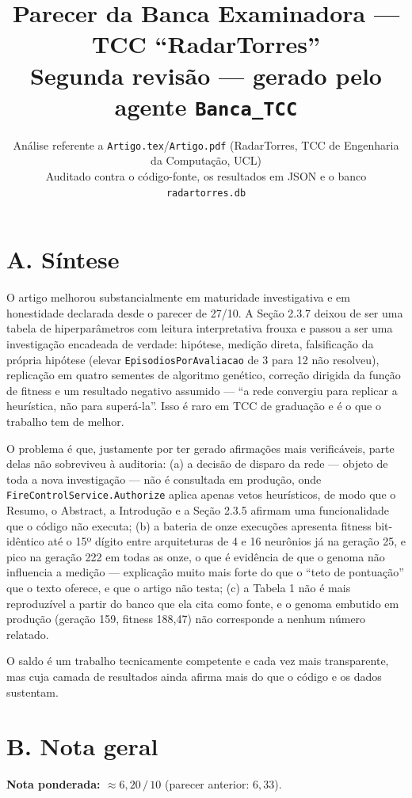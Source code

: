 \documentclass[11pt,a4paper]{article}
\title{\textbf{Parecer da Banca Examinadora — TCC ``RadarTorres''}\\[0.3em]
\large Segunda revisão — gerado pelo agente \texttt{Banca\_TCC}}
\author{}
\date{Análise referente a \texttt{Artigo.tex}/\texttt{Artigo.pdf} (RadarTorres, TCC de Engenharia da Computação, UCL)\\[0.3em]
Auditado contra o código-fonte, os resultados em JSON e o banco \texttt{radartorres.db}}
\begin{document}
\maketitle

\section*{A. Síntese}

O artigo melhorou substancialmente em maturidade investigativa e em honestidade declarada desde o
parecer de 27/10. A Seção 2.3.7 deixou de ser uma tabela de hiperparâmetros com leitura
interpretativa frouxa e passou a ser uma investigação encadeada de verdade: hipótese, medição
direta, falsificação da própria hipótese (elevar \texttt{EpisodiosPorAvaliacao} de 3 para 12 não
resolveu), replicação em quatro sementes de algoritmo genético, correção dirigida da função de
fitness e um resultado negativo assumido --- ``a rede convergiu para replicar a heurística, não
para superá-la''. Isso é raro em TCC de graduação e é o que o trabalho tem de melhor.

O problema é que, justamente por ter gerado afirmações mais verificáveis, parte delas não
sobreviveu à auditoria: (a) a decisão de disparo da rede --- objeto de toda a nova investigação ---
não é consultada em produção, onde \texttt{FireControlService.Authorize} aplica apenas vetos
heurísticos, de modo que o Resumo, o Abstract, a Introdução e a Seção 2.3.5 afirmam uma
funcionalidade que o código não executa; (b) a bateria de onze execuções apresenta fitness
bit-idêntico até o 15º dígito entre arquiteturas de 4 e 16 neurônios já na geração 25, e pico na
geração 222 em todas as onze, o que é evidência de que o genoma não influencia a medição ---
explicação muito mais forte do que o ``teto de pontuação'' que o texto oferece, e que o artigo não
testa; (c) a Tabela 1 não é mais reproduzível a partir do banco que ela cita como fonte, e o genoma
embutido em produção (geração 159, fitness 188,47) não corresponde a nenhum número relatado.

O saldo é um trabalho tecnicamente competente e cada vez mais transparente, mas cuja camada de
resultados ainda afirma mais do que o código e os dados sustentam.

\section*{B. Nota geral}

\textbf{Nota ponderada: $\approx 6{,}20\,/\,10$} \quad (parecer anterior: $6{,}33$).
\end{document}
